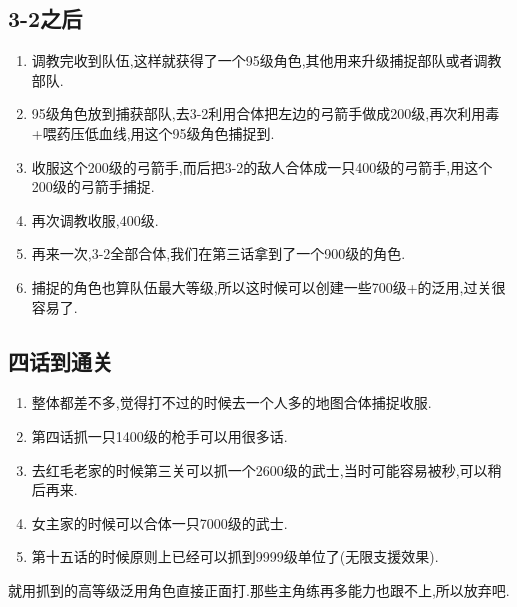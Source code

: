	\subsection{3-2之后}
		\begin{enumerate}

			\item 调教完收到队伍,这样就获得了一个95级角色,其他用来升级捕捉部队或者调教部队.

			\item 95级角色放到捕获部队,去3-2利用合体把左边的弓箭手做成200级,再次利用毒+喂药压低血线,用这个95级角色捕捉到.

			\item 收服这个200级的弓箭手,而后把3-2的敌人合体成一只400级的弓箭手,用这个200级的弓箭手捕捉.

			\item 再次调教收服,400级.

			\item 再来一次,3-2全部合体,我们在第三话拿到了一个900级的角色.

			\item 捕捉的角色也算队伍最大等级,所以这时候可以创建一些700级+的泛用,过关很容易了.

		\end{enumerate}				

	\newpage

	\subsection{四话到通关}

	\begin{enumerate}
		\item 整体都差不多,觉得打不过的时候去一个人多的地图合体捕捉收服.

		\item 第四话抓一只1400级的枪手可以用很多话.

		\item 去红毛老家的时候第三关可以抓一个2600级的武士,当时可能容易被秒,可以稍后再来.

		\item 女主家的时候可以合体一只7000级的武士.

		\item 第十五话的时候原则上已经可以抓到9999级单位了(无限支援效果).

	\end{enumerate}

	就用抓到的高等级泛用角色直接正面打.那些主角练再多能力也跟不上,所以放弃吧.
	
